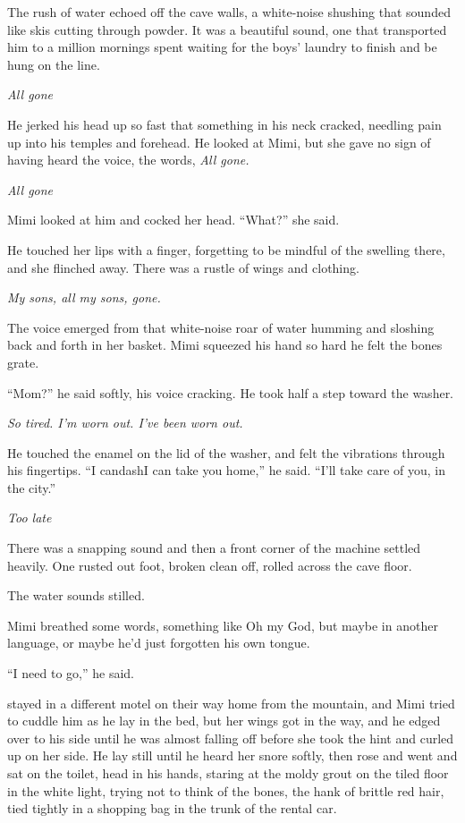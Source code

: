 The rush of water echoed off the cave walls, a white-noise shushing
that sounded like skis cutting through powder.  It was a beautiful
sound, one that transported him to a million mornings spent waiting
for the boys' laundry to finish and be hung on the line.

\textit{All gone}

He jerked his head up so fast that something in his neck cracked,
needling pain up into his temples and forehead.  He looked at Mimi,
but she gave no sign of having heard the voice, the words, \textit{All
gone.}

\textit{All gone}

Mimi looked at him and cocked her head.  ``What?'' she said.

He touched her lips with a finger, forgetting to be mindful of the
swelling there, and she flinched away.  There was a rustle of wings
and clothing.

\textit{My sons, all my sons, gone.}

The voice emerged from that white-noise roar of water humming and
sloshing back and forth in her basket.  Mimi squeezed his hand so hard
he felt the bones grate.

``Mom?'' he said softly, his voice cracking.  He took half a step
toward the washer.

\textit{So tired.  I'm worn out.  I've been worn out.}

He touched the enamel on the lid of the washer, and felt the
vibrations through his fingertips.  ``I candash{}I can take you home,''
he said.  ``I'll take care of you, in the city.''

\textit{Too late}

There was a snapping sound and then a front corner of the machine
settled heavily.  One rusted out foot, broken clean off, rolled across
the cave floor.

The water sounds stilled.

Mimi breathed some words, something like Oh my God, but maybe in
another language, or maybe he'd just forgotten his own tongue.

``I need to go,'' he said.

 stayed in a different motel on their way home from the mountain,
and Mimi tried to cuddle him as he lay in the bed, but her wings got
in the way, and he edged over to his side until he was almost falling
off before she took the hint and curled up on her side.  He lay still
until he heard her snore softly, then rose and went and sat on the
toilet, head in his hands, staring at the moldy grout on the tiled
floor in the white light, trying not to think of the bones, the hank
of brittle red hair, tied tightly in a shopping bag in the trunk of
the rental car.

